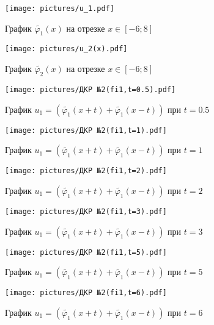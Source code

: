 \documentclass[a4paper, 12pt,fleqn]{extarticle}
\begin{document}
        \begin{figure}
            \caption{        График $\tilde{\varphi_1}(x)$ на отрезке $x\in [-6;8]$   }
            \texttt{[image: pictures/u\_1.pdf]}
        \end{figure}
        \begin{figure}
            \caption{        График $\tilde{\varphi_2}(x)$ на отрезке $x\in [-6;8]$   }
            \texttt{[image: pictures/u\_2(x).pdf]}
        \end{figure}
        \begin{figure}
            \caption{График $u_1=(\tilde{\varphi_1}(x+t)+\tilde{\varphi_1}(x-t))$ при $t=0.5$}
            \texttt{[image: pictures/ДКР №2(fi1,t=0.5).pdf]}
        \end{figure}
        \begin{figure}
            \caption{График $u_1=(\tilde{\varphi_1}(x+t)+\tilde{\varphi_1}(x-t))$ при $t=1$}
            \texttt{[image: pictures/ДКР №2(fi1,t=1).pdf]}
        \end{figure}
        \begin{figure}
            \caption{График $u_1=(\tilde{\varphi_1}(x+t)+\tilde{\varphi_1}(x-t))$ при $t=2$}
            \texttt{[image: pictures/ДКР №2(fi1,t=2).pdf]}
        \end{figure}
        \begin{figure}
            \caption{График $u_1=(\tilde{\varphi_1}(x+t)+\tilde{\varphi_1}(x-t))$ при $t=3$}
            \texttt{[image: pictures/ДКР №2(fi1,t=3).pdf]}
        \end{figure}
        \begin{figure}
            \caption{График $u_1=(\tilde{\varphi_1}(x+t)+\tilde{\varphi_1}(x-t))$ при $t=5$}
            \texttt{[image: pictures/ДКР №2(fi1,t=5).pdf]}
        \end{figure}
        \begin{figure}
            \caption{График $u_1=(\tilde{\varphi_1}(x+t)+\tilde{\varphi_1}(x-t))$ при $t=6$}
            \texttt{[image: pictures/ДКР №2(fi1,t=6).pdf]}
        \end{figure}
\end{document}
